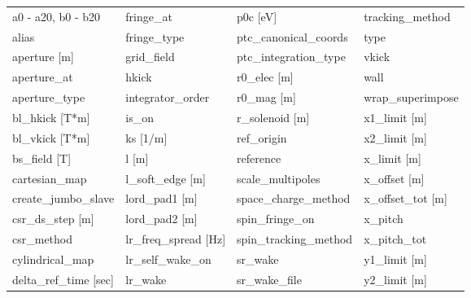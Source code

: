  \begin{tabular}{llll} \toprule
a0 - a20, b0 - b20               & fringe_at                        & p0c [eV]                         & tracking_method                  \\
alias                            & fringe_type                      & ptc_canonical_coords             & type                             \\
aperture [m]                     & grid_field                       & ptc_integration_type             & vkick                            \\
aperture_at                      & hkick                            & r0_elec [m]                      & wall                             \\
aperture_type                    & integrator_order                 & r0_mag [m]                       & wrap_superimpose                 \\
bl_hkick [T*m]                   & is_on                            & r_solenoid [m]                   & x1_limit [m]                     \\
bl_vkick [T*m]                   & ks [1/m]                         & ref_origin                       & x2_limit [m]                     \\
bs_field [T]                     & l [m]                            & reference                        & x_limit [m]                      \\
cartesian_map                    & l_soft_edge [m]                  & scale_multipoles                 & x_offset [m]                     \\
create_jumbo_slave               & lord_pad1 [m]                    & space_charge_method              & x_offset_tot [m]                 \\
csr_ds_step [m]                  & lord_pad2 [m]                    & spin_fringe_on                   & x_pitch                          \\
csr_method                       & lr_freq_spread [Hz]              & spin_tracking_method             & x_pitch_tot                      \\
cylindrical_map                  & lr_self_wake_on                  & sr_wake                          & y1_limit [m]                     \\
delta_ref_time [sec]             & lr_wake                          & sr_wake_file                     & y2_limit [m]                     \\

\end{tabular}
